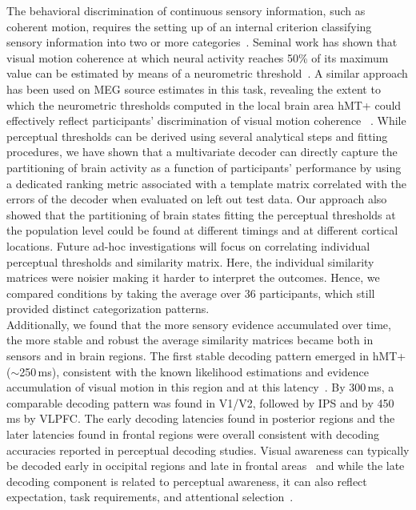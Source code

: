 The behavioral discrimination of continuous sensory information, such as coherent motion, requires the setting up of an internal criterion classifying sensory information into two or more categories~\cite{3jazayeri2006optimal,30britten1996relationship}. Seminal work has shown that visual motion coherence at which neural activity reaches 50\% of its maximum value can be estimated by means of a neurometric threshold~\cite{2britten1992analysis}. A similar approach has been used on MEG source estimates in this task, revealing the extent to which the neurometric thresholds computed in the local brain area hMT+ could effectively reflect participants' discrimination of visual motion coherence ~\cite{23zilber2014supramodal}. While perceptual thresholds can be derived using several analytical steps and fitting procedures, we have shown that a multivariate decoder can directly capture the partitioning of brain activity as a function of participants' performance by using a dedicated ranking metric associated with a template matrix correlated with the errors of the decoder when evaluated on left out test data. Our approach also showed that the partitioning of brain states fitting the perceptual thresholds at the population level could be found at different timings and at different cortical locations. Future ad-hoc investigations will focus on correlating individual perceptual thresholds and similarity matrix. Here, the individual similarity matrices were noisier making it harder to interpret the outcomes. Hence, we compared conditions by  taking the average over 36 participants, which still provided distinct categorization patterns.\\

Additionally, we found that the more sensory evidence accumulated over time, the more stable and robust the average similarity matrices became both in sensors and in brain regions. The first stable decoding pattern emerged in hMT+ ($\sim$250\,ms), consistent with the known likelihood estimations and evidence accumulation of visual motion in this region and at this latency~\cite{2britten1992analysis,3jazayeri2006optimal}. By 300\,ms, a comparable decoding pattern was found in V1/V2, followed by IPS and by 450\,ms by VLPFC. The early decoding latencies found in posterior regions and the later latencies found in frontal regions were overall consistent with decoding accuracies reported in perceptual decoding studies. Visual awareness can typically be decoded early in occipital regions and late in frontal areas~\cite{andersen2016occipital,mostert2015dissociating,de2011perceptual,salti2015distinct,king2016brain} and while the late decoding component is related to perceptual awareness, it can also reflect expectation, task requirements, and attentional selection~\cite{andersen2016occipital,mostert2015dissociating}.


